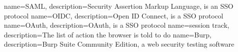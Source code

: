 
{
    name=SAML,
    description={Security Assertion Markup Language, is an SSO protocol}
}
{
    name=OIDC,
    description={Open ID Connect, is a SSO protocol} 
}
{
    name=OAuth,
    description={OAuth, is a SSO protocol}
}
{
    name=session track,
    description={The list of action the browser is told to do}
}
{
    name=Burp,
    description={Burp Suite Community Edition, a web security testing software}
}


\makeglossaries